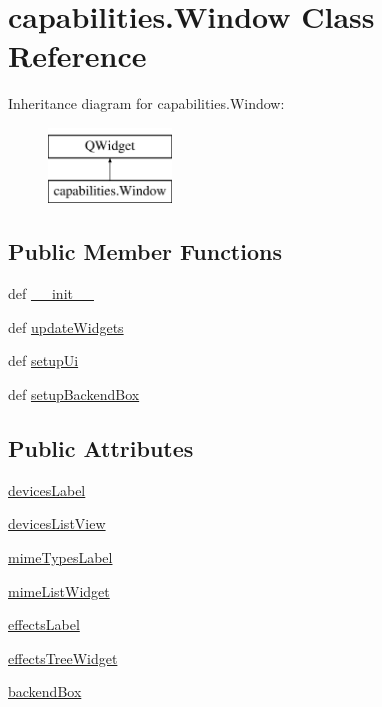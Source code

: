 \hypertarget{classcapabilities_1_1Window}{}\section{capabilities.\+Window Class Reference}
\label{classcapabilities_1_1Window}
Inheritance diagram for capabilities.\+Window\+:\begin{figure}[H]
\begin{center}
\leavevmode
\includegraphics[height=2.000000cm]{classcapabilities_1_1Window}
\end{center}
\end{figure}
\subsection*{Public Member Functions}
\begin{DoxyCompactItemize}
\item 
def \hyperlink{classcapabilities_1_1Window_ada20dfd6b9451b0011622eced035a511}{\+\_\+\+\_\+init\+\_\+\+\_\+}
\item 
def \hyperlink{classcapabilities_1_1Window_a861cc2b17f4f0c83bb637b3f753a8b3d}{update\+Widgets}
\item 
def \hyperlink{classcapabilities_1_1Window_af25b51bb7e672ffcd63cf1db9ff4b58e}{setup\+Ui}
\item 
def \hyperlink{classcapabilities_1_1Window_aa23557c89390870f4fc1b5f0ce13a0b5}{setup\+Backend\+Box}
\end{DoxyCompactItemize}
\subsection*{Public Attributes}
\begin{DoxyCompactItemize}
\item 
\hyperlink{classcapabilities_1_1Window_aa16158573b3584d8331c04fc354b5104}{devices\+Label}
\item 
\hyperlink{classcapabilities_1_1Window_a7dee8af5d6225052d31b7b3eca3c8b34}{devices\+List\+View}
\item 
\hyperlink{classcapabilities_1_1Window_af3e76a03dda9054fc9e7a095f5def94d}{mime\+Types\+Label}
\item 
\hyperlink{classcapabilities_1_1Window_ac37ef4ac9c401055179ec8f51f20f2b3}{mime\+List\+Widget}
\item 
\hyperlink{classcapabilities_1_1Window_a331fb06a3a71d8dcafa327be69a1c059}{effects\+Label}
\item 
\hyperlink{classcapabilities_1_1Window_a6f3a09001053cece6f9bef9c161d54f0}{effects\+Tree\+Widget}
\item 
\hyperlink{classcapabilities_1_1Window_a52aaab6ea56394e6bf7743288a5a9ce8}{backend\+Box}
\end{DoxyCompactItemize}


